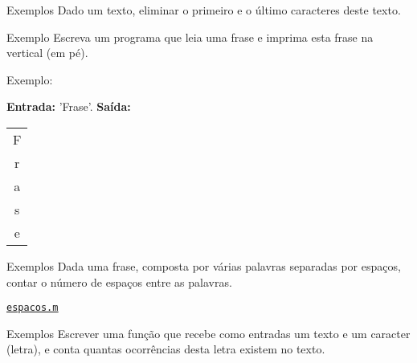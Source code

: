 \documentclass[hyperref={pdfpagelabels=false}]{beamer}
\begin{document}
\begin{frame}{Exemplos}
  Dado um texto, eliminar o primeiro e o último caracteres deste texto.
  
\end{frame}

\begin{frame}{Exemplo}
  Escreva um programa que leia uma frase e imprima esta frase na vertical (em pé).

	Exemplo:

  \textbf{Entrada:} 'Frase'. \textbf{Saída:} \begin{tabular}{c} F\\r\\a\\s\\e\end{tabular}

\end{frame}

\begin{frame}{Exemplos}
  Dada uma frase, composta por várias palavras separadas por espaços, contar o número de espaços entre as palavras.
	\begin{center} \href{listings/espacos.m}{\underline{\texttt{espacos.m}}} \end{center}
\end{frame}

\begin{frame}{Exemplos}
	Escrever uma função que recebe como entradas um texto e um caracter (letra), e conta quantas ocorrências desta letra existem no texto.

\end{frame}
\end{document}
